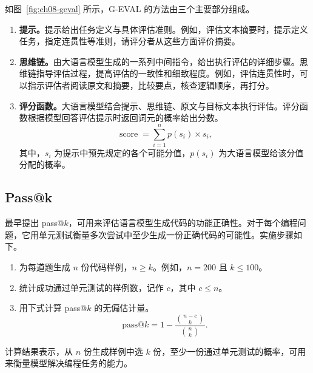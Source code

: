 
如图~\ref{fig:ch08-geval} 所示，G-EVAL 的方法由三个主要部分组成。

\begin{enumerate}
\item \textbf{提示。}提示给出任务定义与具体评估准则。例如，评估文本摘要时，提示定义任务，指定连贯性等准则，请评分者从这些方面评价摘要。
\item \textbf{思维链。}由大语言模型生成的一系列中间指令，给出执行评估的详细步骤。思维链指导评估过程，提高评估的一致性和细致程度。例如，评估连贯性时，可以指示评估者阅读原文和摘要，比较要点，核查逻辑顺序，再打分。
\item \textbf{评分函数。}大语言模型结合提示、思维链、原文与目标文本执行评估。评分函数根据模型回答评估提示时返回词元的概率给出分数。
\begin{equation}
\operatorname{score}=\sum_{i=1}^{n}p(s_i)\times s_i,
\label{eq:ch08-geval}
\end{equation}
其中，$s_i$ 为提示中预先规定的各个可能分值，$p(s_i)$ 为大语言模型给该分值分配的概率。
\end{enumerate}

\subsection{Pass@k}
最早提出 pass@$k$，可用来评估语言模型生成代码的功能正确性。对于每个编程问题，它用单元测试衡量多次尝试中至少生成一份正确代码的可能性。实施步骤如下。

\begin{enumerate}
\item 为每道题生成 $n$ 份代码样例，$n\geq k$。例如，$n=200$ 且 $k\leq100$。
\item 统计成功通过单元测试的样例数，记作 $c$，其中 $c\leq n$。
\item 用下式计算 pass@$k$ 的无偏估计量。
\begin{equation}
\mathrm{pass}@k=1-\frac{\binom{n-c}{k}}{\binom{n}{k}}.
\label{eq:ch08-pass}
\end{equation}
\end{enumerate}

计算结果表示，从 $n$ 份生成样例中选 $k$ 份，至少一份通过单元测试的概率，可用来衡量模型解决编程任务的能力。
